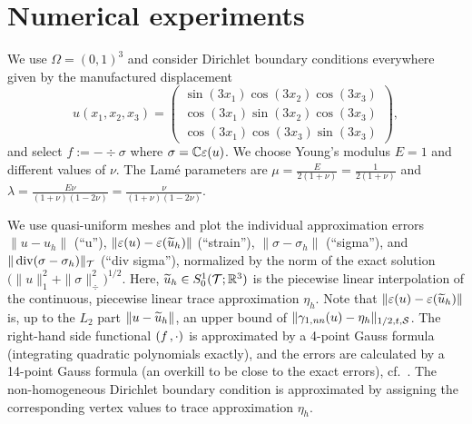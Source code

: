 \documentclass[11pt]{article}
\begin{document}
\section{Numerical experiments} \label{sec_num}


We use $\Omega=(0,1)^3$ and consider Dirichlet boundary conditions everywhere
given by the manufactured displacement
\[
   u(x_1,x_2,x_3)
   = \begin{pmatrix}
      \sin(3x_1)\cos(3x_2)\cos(3x_3)\\ \cos(3x_1)\sin(3x_2)\cos(3x_3)\\
      \cos(3x_1)\cos(3x_3)\sin(3x_3)
     \end{pmatrix},
\]
and select $f:=-\div\sigma$ where $\sigma=\mathbb{C}\varepsilon(u)$.
We choose Young's modulus $E=1$ and different values of $\nu$.
The Lam\'e parameters are $\mu = \frac E{2(1+\nu)} = \frac 1{2(1+\nu)}$ and
$\lambda=\frac{E\nu}{(1+\nu)(1-2\nu)}=\frac{\nu}{(1+\nu)(1-2\nu)}$.

We use quasi-uniform meshes and plot the individual approximation errors
$\|u-u_h\|$ (``u''), $\|\varepsilon(u)-\varepsilon(\widetilde u_h)\|$ (``strain''),
$\|\sigma-\sigma_h\|$ (``sigma''), and $\|\operatorname{div}(\sigma-\sigma_h)\|_{\mathcal{T}}$ (``div sigma''),
normalized by the norm of the exact solution
$\bigl(\|u\|_1^2+\|\sigma\|_{\div}^2\bigr)^{1/2}$.
Here, $\widetilde u_h\in S^1_0(\mathcal{T};\mathbb{R}^3)$ is the piecewise linear interpolation of the continuous,
piecewise linear trace approximation $\eta_h$.
Note that $\|\varepsilon(u)-\varepsilon(\widetilde u_h)\|$ is, up to the
$L_2$ part $\|u-\widetilde u_h\|$, an upper bound of $\|{\gamma_{1,\mathit{nn}}}(u)-\eta_h\|_{1/2,t,\mathcal{S}}$.
The right-hand side functional $(f\hspace*{.5mm},\cdot)$ is approximated by a 4-point Gauss
formula (integrating quadratic polynomials exactly),
and the errors are calculated by a 14-point Gauss formula (an overkill to be close to
the exact errors), cf.~\cite{JaskowiezS_21_HOS}. The non-homogeneous Dirichlet boundary condition
is approximated by assigning the corresponding vertex values to
trace approximation $\eta_h$.
\end{document}
